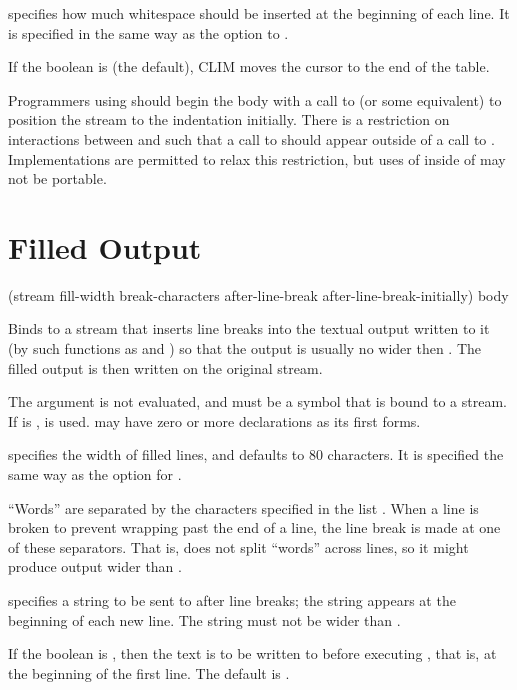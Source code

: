  specifies how much whitespace should be inserted at the
beginning of each line.  It is specified in the same way as the 
option to .

If the boolean  is  (the default), CLIM moves the
cursor to the end of the table.

Programmers using  should begin the body with a call to
 (or some equivalent) to position the stream to the indentation
initially.  There is a restriction on interactions between 
and  such that a call to  should appear
outside of a call to .  Implementations are permitted to
relax this restriction, but uses of  inside of
 may not be portable.


\section {Filled Output}

 {(stream \key fill-width break-characters
                                         after-line-break after-line-break-initially) 
                            \body body}

Binds  to a stream that inserts line breaks into the textual output
written to it (by such functions as  and ) so
that the output is usually no wider then .  The filled output is
then written on the original stream.

The  argument is not evaluated, and must be a symbol that is bound
to a stream.  If  is ,  is used.
 may have zero or more declarations as its first forms.

 specifies the width of filled lines, and defaults to 80
characters.  It is specified the same way as the  option for
.

``Words'' are separated by the characters specified in the list
.  When a line is broken to prevent wrapping past the end
of a line, the line break is made at one of these separators.  That is,
 does not split ``words'' across lines, so it might produce
output wider than .

 specifies a string to be sent to  after line
breaks; the string appears at the beginning of each new line.  The string must
not be wider than .

If the boolean  is , then the
 text is to be written to  before executing
, that is, at the beginning of the first line.  The default is
.
